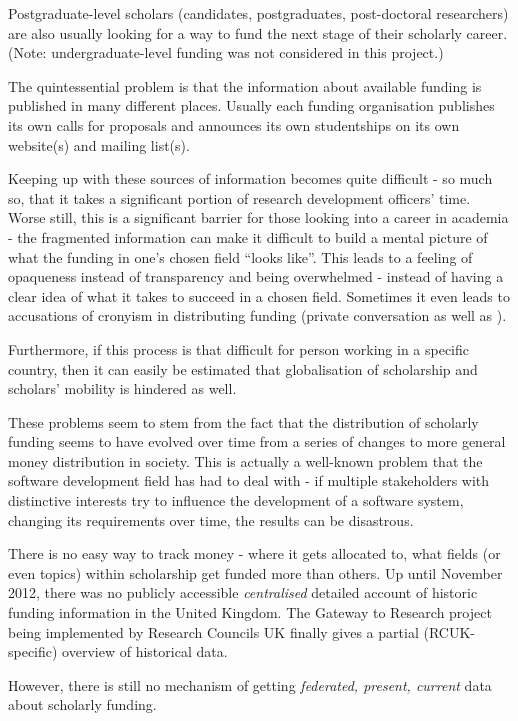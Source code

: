 Postgraduate-level scholars (candidates, postgraduates, post-doctoral researchers) are also usually looking for a way to fund the next stage of their scholarly career. (Note: undergraduate-level funding was not considered in this project.)

The quintessential problem is that the information about available funding is published in many different places. Usually each funding organisation publishes its own calls for proposals and announces its own studentships on its own website(s) and mailing list(s).

Keeping up with these sources of information becomes quite difficult - so much so, that it takes a significant portion of research development officers' time. Worse still, this is a significant barrier for those looking into a career in academia - the fragmented information can make it difficult to build a mental picture of what the funding in one's chosen field ``looks like''. This leads to a feeling of opaqueness instead of transparency and being overwhelmed - instead of having a clear idea of what it takes to succeed in a chosen field. Sometimes it even leads to accusations of cronyism in distributing funding (private conversation as well as \cite{cronyism1, cronyism2}).

Furthermore, if this process is that difficult for person working in a specific country, then it can easily be estimated that globalisation of scholarship and scholars' mobility is hindered as well.

These problems seem to stem from the fact that the distribution of scholarly funding seems to have evolved over time from a series of changes to more general money distribution in society. This is actually a well-known problem that the software development field has had to deal with - if multiple stakeholders with distinctive interests try to influence the development of a software system, changing its requirements over time, the results can be disastrous.

There is no easy way to track money - where it gets allocated to, what fields (or even topics) within scholarship get funded more than others. Up until November 2012, there was no publicly accessible \emph{centralised} detailed account of historic funding information in the United Kingdom. The Gateway to Research project being implemented by Research Councils UK finally gives a partial (RCUK-specific) overview of historical data.

However, there is still no mechanism of getting \emph{federated, present, current} data about scholarly funding.

